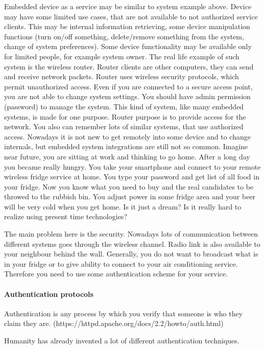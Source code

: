 Embedded device as a service may be similar to system example above. Device may
have some limited use cases, that are not available to not authorized service
clients. This may be internal information retrieving, some  device
manipulation functions (turn on/off something, delete/remove something from the
system, change of system preferences). Some device functionality may be
available only for limited people, for example system owner. The real life example of such system is the wireless
router. Router clients are other computers, they can send and receive network
packets. Router uses wireless security protocols, which permit unauthorized
access. Even if you are connected to a secure access point, you are not able to
change system settings. You should have admin permission (password) to manage
the system. This kind of system, like many embedded systems, is made for one
purpose. Router purpose is to provide access for the network. You also can
remember lots of similar systems, that use authorized access. Nowadays it is not new to get
remotely into some device and to change internals, but embedded system
integrations are still not so common. Imagine near future, you are sitting at
work and thinking to go home. After a long day you became really hungry. You
take your smartphone and connect to your remote wireless fridge service at home. You type
your password and get list of all food in your fridge. Now you know what you
need to buy and the real candidates to be throwed to the rubbish bin. You adjust
power in some fridge area and your beer will be very cold when you get home. Is
it just a dream? Is it really hard to realize using present time technologies?


The main problem here is the security. Nowadays lots of communication between
different systems goes through the wireless channel. Radio link is also
available to your neighbour behind the wall. Generally, you do not want to
broadcast what is in your fridge or to give ability to connect to your air
conditioning service. Therefore you need to use some authentication scheme for
your service.

\paragraph{Authentication protocols}

Authentication is any process by which you verify that someone is who they claim
they are. (https://httpd.apache.org/docs/2.2/howto/auth.html)

Humanity has already invented a lot of different authentication techniques. 

